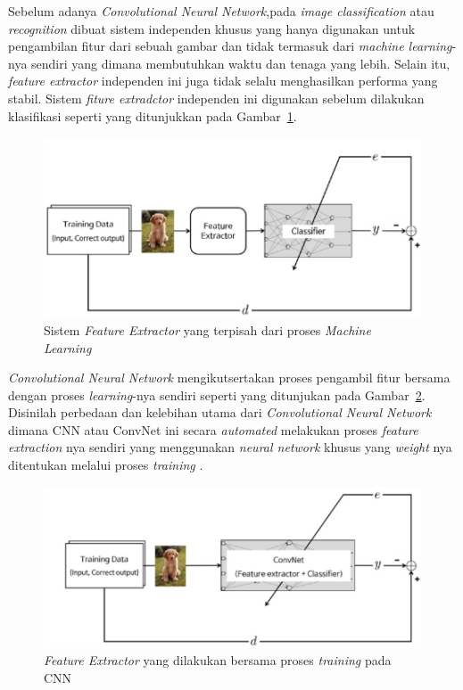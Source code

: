 \par Sebelum adanya \emph{Convolutional Neural Network},pada \emph{image classification} atau \emph{recognition} dibuat sistem independen khusus yang hanya digunakan
untuk pengambilan fitur dari sebuah gambar dan tidak termasuk dari \emph{machine learning}-nya sendiri yang dimana membutuhkan waktu dan tenaga yang lebih. Selain itu, \emph{feature extractor}
independen ini juga tidak selalu menghasilkan performa yang stabil. Sistem \emph{fiture extradctor} independen ini digunakan sebelum dilakukan klasifikasi seperti yang ditunjukkan pada Gambar~\ref{fig:imgecog_beforeconv}.


\begin{figure}[ht]
    \centering
    \includegraphics[scale=1]{gambar/imgrecog_beforconv.jpg}
    \caption{Sistem \emph{Feature Extractor} yang terpisah dari proses \emph{Machine Learning}}
    \label{fig:imgecog_beforeconv}  
\end{figure}

\par \emph{Convolutional Neural Network} mengikutsertakan proses pengambil fitur bersama dengan 
proses \emph{learning}-nya sendiri seperti yang ditunjukan pada Gambar~\ref{fig:imgrecog_afterconv}. Disinilah perbedaan dan kelebihan utama dari \emph{Convolutional Neural Network}
dimana CNN atau ConvNet ini secara \emph{automated} melakukan proses \emph{feature extraction} nya sendiri yang
menggunakan \emph{neural network} khusus yang \emph{weight} nya ditentukan melalui proses \emph{training} \cite{kim2018safety}.

\begin{figure}[ht]
    \centering
    \includegraphics[scale=1]{gambar/imgrecog_afterconv.jpg}
    \caption{\emph{Feature Extractor} yang dilakukan bersama proses \emph{training} pada CNN}
    \label{fig:imgrecog_afterconv}  
\end{figure}



